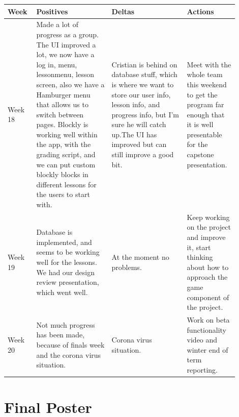 \documentclass[draftclsnofoot,10pt,onecolumn]{IEEEtran}
\begin{document}
        \newpage
        \begin{tabular}{p{0.1\linewidth}p{0.3\linewidth}p{0.3\linewidth}p{0.2\linewidth}}
        \hline
            \textbf{Week}
             & \textbf{Positives}
             & \textbf{Deltas}
             & \textbf{Actions}\\
             \hline
             Week 18
             & Made a lot of progress as a group. The UI improved a lot, we now have a log in, menu, lessonmenu, lesson screen, also we have a Hamburger menu that allows us to switch between pages. Blockly is working well within the app, with the grading script, and we can put custom blockly blocks in different lessons for the users to start with.
             & Cristian is behind on database stuff, which is where we want to store our user info, lesson info, and progress info, but I'm sure he will catch up.The UI has improved but can still improve a good bit.
             & Meet with the whole team this weekend to get the program far enough that it is well presentable for the capstone presentation.\\
             \hline
             Week 19
             & Database is implemented, and seems to be working well for the lessons. We had our design review presentation, which went well.
             & At the moment no problems.
             & Keep working on the project and improve it, start thinking about how to approach the game component of the project.\\
             \hline
             Week 20
             & Not much progress has been made, because of finals week and the corona virus situation.
             & Corona virus situation.
             & Work on beta functionality video and winter end of term reporting.\\
             \hline
        \end{tabular}

\clearpage
\section{Final Poster}
\end{document}

